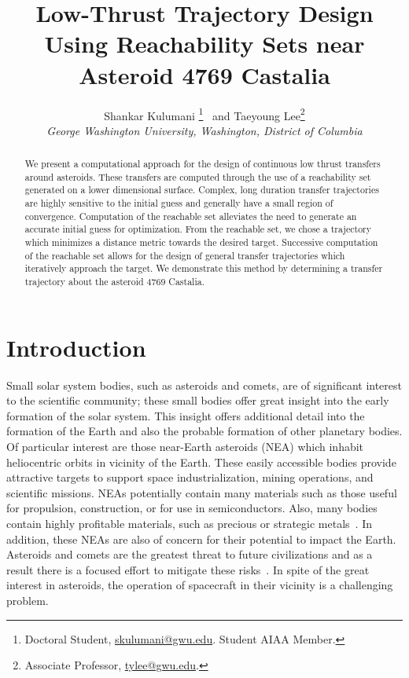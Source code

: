 \documentclass[]{aiaa-tc}%
\title{Low-Thrust Trajectory Design Using Reachability Sets near Asteroid 4769 Castalia}
\author{
  Shankar Kulumani\thanksibid{1}%
    \thanks{Doctoral Student, \href{mailto:skulumani@gwu.edu}{skulumani@gwu.edu}. Student AIAA Member.}
  \ and Taeyoung Lee\thanksibid{2}\thanks{Associate Professor, \href{mailto:tylee@gwu.edu}{tylee@gwu.edu}.}\\
  {\normalsize\itshape
   George Washington University, Washington, District of Columbia }\\
   }
\begin{document}
\maketitle

\begin{abstract}\label{sec:abstract}

We present a computational approach for the design of continuous low thrust transfers around asteroids.
These transfers are computed through the use of a reachability set generated on a lower dimensional \Poincare surface.
Complex, long duration transfer trajectories are highly sensitive to the initial guess and generally have a small region of convergence.
Computation of the reachable set alleviates the need to generate an accurate initial guess for optimization.
From the reachable set, we chose a trajectory which minimizes a distance metric towards the desired target.
Successive computation of the reachable set allows for the design of general transfer trajectories which iteratively approach the target.
We demonstrate this method by determining a transfer trajectory about the asteroid 4769 Castalia.

\end{abstract}


\section{Introduction}\label{sec:introduction}

Small solar system bodies, such as asteroids and comets, are of significant interest to the scientific community; these small bodies offer great insight into the early formation of the solar system.
This insight offers additional detail into the formation of the Earth and also the probable formation of other planetary bodies.
Of particular interest are those near-Earth asteroids (NEA) which inhabit heliocentric orbits in vicinity of the Earth.
These easily accessible bodies provide attractive targets to support space industrialization, mining operations, and scientific missions.
NEAs potentially contain many materials such as those useful for propulsion, construction, or for use in semiconductors.
Also, many bodies contain highly profitable materials, such as precious or strategic metals~\cite{ross2001}.
In addition, these NEAs are also of concern for their potential to impact the Earth.
Asteroids and comets are the greatest threat to future civilizations and as a result there is a focused effort to mitigate these risks~\cite{wie2008}.
In spite of the great interest in asteroids, the operation of spacecraft in their vicinity is a challenging problem.
\end{document}
